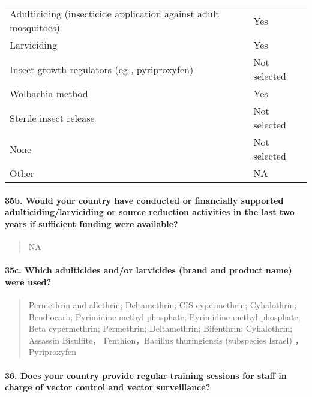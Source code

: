 \documentclass[
]{article}
\begin{document}
\begin{longtable}[]{@{}ll@{}}
\toprule
\endhead
Adulticiding (insecticide application against adult mosquitoes) & Yes \\
Larviciding & Yes \\
Insect growth regulators (eg , pyriproxyfen) & Not selected \\
Wolbachia method & Yes \\
Sterile insect release & Not selected \\
None & Not selected \\
Other & NA \\
\bottomrule
\end{longtable}

\hypertarget{b.-would-your-country-have-conducted-or-financially-supported-adulticidinglarviciding-or-source-reduction-activities-in-the-last-two-years-if-sufficient-funding-were-available}{%
\paragraph{35b. Would your country have conducted or financially
supported adulticiding/larviciding or source reduction activities in the
last two years if sufficient funding were
available?}\label{b.-would-your-country-have-conducted-or-financially-supported-adulticidinglarviciding-or-source-reduction-activities-in-the-last-two-years-if-sufficient-funding-were-available}}

\begin{quote}
NA
\end{quote}

\hypertarget{c.-which-adulticides-andor-larvicides-brand-and-product-name-were-used}{%
\paragraph{35c. Which adulticides and/or larvicides (brand and product
name) were
used?}\label{c.-which-adulticides-andor-larvicides-brand-and-product-name-were-used}}

\begin{quote}
Permethrin and allethrin; Deltamethrin; CIS cypermethrin; Cyhalothrin;
Bendiocarb; Pyrimidine methyl phosphate; Pyrimidine methyl phosphate;
Beta cypermethrin; Permethrin; Deltamethrin; Bifenthrin; Cyhalothrin;
Assassin Bisulfite， Fenthion，Bacillus thuringiensis (subspecies
Israel) ，Pyriproxyfen
\end{quote}

\hypertarget{does-your-country-provide-regular-training-sessions-for-staff-in-charge-of-vector-control-and-vector-surveillance}{%
\paragraph{36. Does your country provide regular training sessions for
staff in charge of vector control and vector
surveillance?}\label{does-your-country-provide-regular-training-sessions-for-staff-in-charge-of-vector-control-and-vector-surveillance}}
\end{document}
